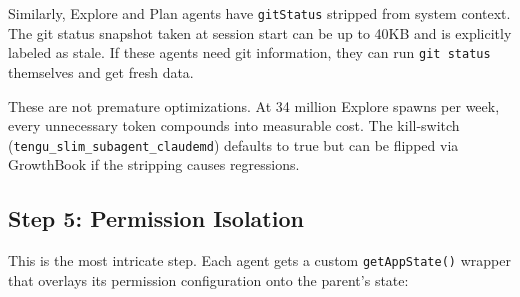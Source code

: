 \documentclass[
  english,
  11pt,
  letterpaper,
]{book}
\begin{document}
Similarly, Explore and Plan agents have \texttt{gitStatus} stripped from
system context. The git status snapshot taken at session start can be up
to 40KB and is explicitly labeled as stale. If these agents need git
information, they can run \texttt{git\ status} themselves and get fresh
data.

These are not premature optimizations. At 34 million Explore spawns per
week, every unnecessary token compounds into measurable cost. The
kill-switch (\texttt{tengu\_slim\_subagent\_claudemd}) defaults to true
but can be flipped via GrowthBook if the stripping causes regressions.

\subsection{Step 5: Permission
Isolation}\label{step-5-permission-isolation}

This is the most intricate step. Each agent gets a custom
\texttt{getAppState()} wrapper that overlays its permission
configuration onto the parent's state:
\end{document}
